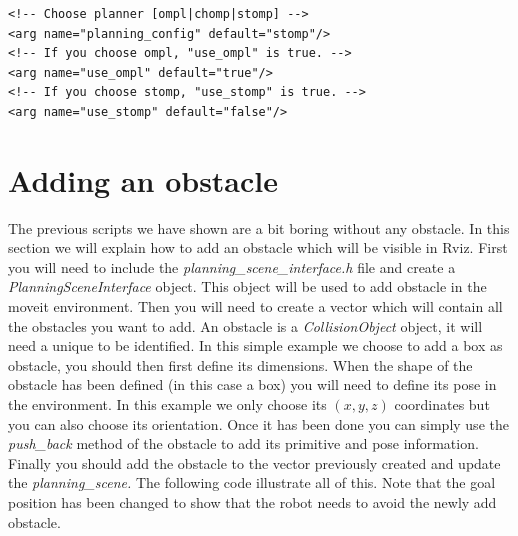 \begin{lstlisting}
<!-- Choose planner [ompl|chomp|stomp] -->
<arg name="planning_config" default="stomp"/>
<!-- If you choose ompl, "use_ompl" is true. -->
<arg name="use_ompl" default="true"/>
<!-- If you choose stomp, "use_stomp" is true. -->
<arg name="use_stomp" default="false"/>
\end{lstlisting}


\section{Adding an obstacle}

The previous scripts we have shown are a bit boring without any obstacle. In this section we will explain how to add an obstacle which will be visible in Rviz. First you will need to include the \emph{planning\_scene\_interface.h} file and create a \emph{PlanningSceneInterface} object. This object will be used to add obstacle in the moveit environment. Then you will need to create a vector which will contain all the obstacles you want to add. An obstacle is a \emph{CollisionObject} object, it will need a unique to be identified. In this simple example we choose to add a box as obstacle, you should then first define its dimensions. When the shape of the obstacle has been defined (in this case a box) you will need to define its pose in the environment. In this example we only choose its $(x,y,z)$ coordinates but you can also choose its orientation. Once it has been done you can simply use the \emph{push\_back} method of the obstacle to add its primitive and pose information. Finally you should add the obstacle to the vector previously created and update the \emph{planning\_scene.
}
The following code illustrate all of this. Note that the goal position has been changed to show that the robot needs to avoid the newly add obstacle.


